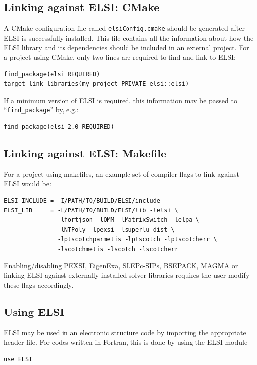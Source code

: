 \documentclass{report}
\begin{document}
\subsection{Linking against ELSI: CMake}
\label{subsec:import_cmake}
A CMake configuration file called \texttt{elsiConfig.cmake} should be generated after ELSI is successfully installed. This file contains all the information about how the ELSI library and its dependencies should be included in an external project. For a project using CMake, only two lines are required to find and link to ELSI:
\begin{tcolorbox}
\begin{verbatim}
find_package(elsi REQUIRED)
target_link_libraries(my_project PRIVATE elsi::elsi)
\end{verbatim}
\end{tcolorbox}

If a minimum version of ELSI is required, this information may be passed to ``\texttt{find\_package}'' by, e.g.:
\begin{tcolorbox}
\begin{verbatim}
find_package(elsi 2.0 REQUIRED)
\end{verbatim}
\end{tcolorbox}

\subsection{Linking against ELSI: Makefile}
\label{subsec:import_makefile}
For a project using makefiles, an example set of compiler flags to link against ELSI would be:
\begin{tcolorbox}
\begin{verbatim}
ELSI_INCLUDE = -I/PATH/TO/BUILD/ELSI/include
ELSI_LIB     = -L/PATH/TO/BUILD/ELSI/lib -lelsi \
               -lfortjson -lOMM -lMatrixSwitch -lelpa \
               -lNTPoly -lpexsi -lsuperlu_dist \
               -lptscotchparmetis -lptscotch -lptscotcherr \
               -lscotchmetis -lscotch -lscotcherr
\end{verbatim}
\end{tcolorbox}

Enabling/disabling PEXSI, EigenExa, SLEPc-SIPs, BSEPACK, MAGMA or linking ELSI against externally installed solver libraries requires the user modify these flags accordingly.

\subsection{Using ELSI}
\label{subsec:import_use}
ELSI may be used in an electronic structure code by importing the appropriate header file. For codes written in Fortran, this is done by using the ELSI module
\begin{tcolorbox}
\begin{verbatim}
use ELSI
\end{verbatim}
\end{tcolorbox}
\end{document}
